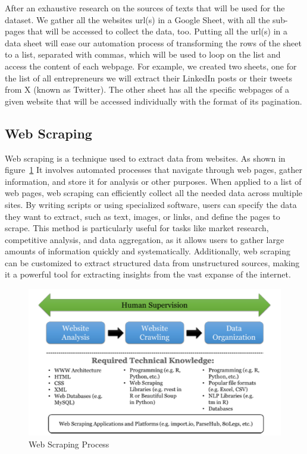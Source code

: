 After an exhaustive research on the sources of texts that will be used for the dataset. We gather all the websites \ac{url}(s) in a Google Sheet, with all the sub-pages that will be accessed to collect the data, too. Putting all the \ac{url}(s) in a data sheet will ease our automation process of transforming the rows of the sheet to a list, separated with commas, which will be used to loop on the list and access the content of each webpage. For example, we created two sheets, one for the list of all entrepreneurs we will extract their LinkedIn posts or their tweets from X (known as Twitter). The other sheet has all the specific webpages of a given website that will be accessed individually with the format of its pagination.

\subsection{Web Scraping}
Web scraping \cite{khder2021web} is a technique used to extract data from websites. As shown in figure~\ref{fig: webscraping} It involves automated processes that navigate through web pages, gather information, and store it for analysis or other purposes. When applied to a list of web pages, web scraping can efficiently collect all the needed data across multiple sites. By writing scripts or using specialized software, users can specify the data they want to extract, such as text, images, or links, and define the pages to scrape. This method is particularly useful for tasks like market research, competitive analysis, and data aggregation, as it allows users to gather large amounts of information quickly and systematically. Additionally, web scraping can be customized to extract structured data from unstructured sources, making it a powerful tool for extracting insights from the vast expanse of the internet.

\begin{figure}[H]
\centering
\includegraphics[width=12cm]{webScrapeProcess}
\caption{Web Scraping Process \cite{khder2021web}}
\label{fig: webscraping}
\end{figure}

